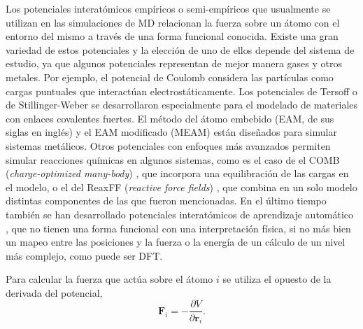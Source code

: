 Los potenciales interatómicos empíricos o semi-empíricos que usualmente se 
utilizan en las simulaciones de MD relacionan la fuerza sobre un átomo con el 
entorno del mismo a través de una forma funcional conocida. Existe una gran 
variedad de estos potenciales y la elección de uno de ellos depende del sistema 
de estudio, ya que algunos potenciales representan de mejor manera gases y otros 
metales. Por ejemplo, el potencial de Coulomb \cite{coulomb} considera las 
partículas como cargas puntuales que interactúan electrostáticamente. Los 
potenciales de Tersoff \cite{tersoff} o de Stillinger-Weber 
\cite{stillinger-weber} se desarrollaron especialmente para el modelado de 
materiales con enlaces covalentes fuertes.
El método del átomo embebido (EAM, de sus siglas en inglés) \cite{eam} 
y el EAM modificado (MEAM) \cite{meam} están diseñados para simular sistemas 
metálicos. Otros potenciales con enfoques más avanzados permiten simular
reacciones químicas en algunos sistemas, como es el caso de el COMB 
(\textit{charge-optimized many-body}) \cite{comb}, que incorpora una 
equilibración de las cargas en el modelo, o el del ReaxFF (\textit{reactive 
force fields}) \cite{reaxff}, que combina en un solo modelo distintas 
componentes de las que fueron mencionadas. En el último tiempo también se han 
desarrollado potenciales interatómicos de aprendizaje automático 
\cite{behler2016, behler2017, deringer2019}, que no tienen una forma funcional con
una interpretación física, si no más bien un mapeo entre las posiciones y la 
fuerza o la energía de un cálculo de un nivel más complejo, como puede ser DFT.

Para calcular la fuerza que actúa sobre el átomo $i$ se utiliza el opuesto 
de la derivada del potencial,
\begin{equation}\label{eq:fuerzas}
    \mathbf{F}_i = - \frac{\partial V}{\partial \mathbf{r}_i}.
\end{equation}

